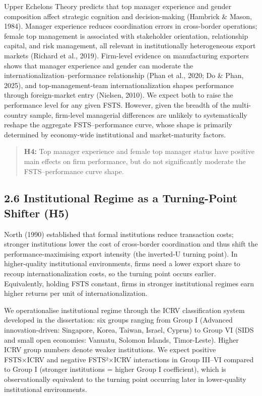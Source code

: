 \documentclass[
  12pt]{article}
\begin{document}
Upper Echelons Theory predicts that top manager experience and gender
composition affect strategic cognition and decision-making (Hambrick \&
Mason, 1984). Manager experience reduces coordination errors in
cross-border operations; female top management is associated with
stakeholder orientation, relationship capital, and risk management, all
relevant in institutionally heterogeneous export markets (Richard et
al., 2019). Firm-level evidence on manufacturing exporters shows that
manager experience and gender can moderate the
internationalization--performance relationship (Phan et al., 2020; Do \&
Phan, 2025), and top-management-team internationalization shapes
performance through foreign-market entry (Nielsen, 2010). We expect both
to raise the performance level for any given FSTS. However, given the
breadth of the multi-country sample, firm-level managerial differences
are unlikely to systematically reshape the aggregate FSTS--performance
curve, whose shape is primarily determined by economy-wide institutional
and market-maturity factors.

\begin{quote}
\textbf{H4:} Top manager experience and female top manager status have
positive main effects on firm performance, but do not significantly
moderate the FSTS--performance curve shape.
\end{quote}

\hypertarget{institutional-regime-as-a-turning-point-shifter-h5}{%
\subsection{2.6 Institutional Regime as a Turning-Point Shifter
(H5)}\label{institutional-regime-as-a-turning-point-shifter-h5}}

North (1990) established that formal institutions reduce transaction
costs; stronger institutions lower the cost of cross-border coordination
and thus shift the performance-maximising export intensity (the
inverted-U turning point). In higher-quality institutional environments,
firms need a lower export share to recoup internationalization costs, so
the turning point occurs earlier. Equivalently, holding FSTS constant,
firms in stronger institutional regimes earn higher returns per unit of
internationalization.

We operationalise institutional regime through the ICRV classification
system developed in the dissertation: six groups ranging from Group I
(Advanced innovation-driven: Singapore, Korea, Taiwan, Israel, Cyprus)
to Group VI (SIDS and small open economies: Vanuatu, Solomon Islands,
Timor-Leste). Higher ICRV group numbers denote weaker institutions. We
expect positive FSTS×ICRV and negative FSTS²×ICRV interactions in Group
III--VI compared to Group I (stronger institutions = higher Group I
coefficient), which is observationally equivalent to the turning point
occurring later in lower-quality institutional environments.
\end{document}

